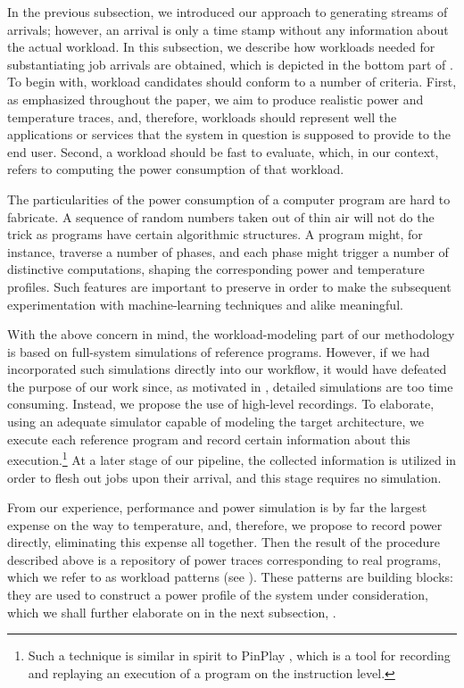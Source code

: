 In the previous subsection, we introduced our approach to generating streams of
arrivals; however, an arrival is only a time stamp without any information about
the actual workload. In this subsection, we describe how workloads needed for
substantiating job arrivals are obtained, which is depicted in the bottom part
of . To begin with, workload candidates should conform to a
number of criteria. First, as emphasized throughout the paper, we aim to produce
realistic power and temperature traces, and, therefore, workloads should
represent well the applications or services that the system in question is
supposed to provide to the end user. Second, a workload should be fast to
evaluate, which, in our context, refers to computing the power consumption of
that workload.

The particularities of the power consumption of a computer program are hard to
fabricate. A sequence of random numbers taken out of thin air will not do the
trick as programs have certain algorithmic structures. A program might, for
instance, traverse a number of phases, and each phase might trigger a number of
distinctive computations, shaping the corresponding power and temperature
profiles. Such features are important to preserve in order to make the
subsequent experimentation with machine-learning techniques and alike
meaningful.

With the above concern in mind, the workload-modeling part of our methodology is
based on full-system simulations of reference programs. However, if we had
incorporated such simulations directly into our workflow, it would have defeated
the purpose of our work since, as motivated in , detailed
simulations are too time consuming. Instead, we propose the use of high-level
recordings. To elaborate, using an adequate simulator capable of modeling the
target architecture, we execute each reference program and record certain
information about this execution.\footnote{Such a technique is similar in spirit
to PinPlay \cite{patil2010}, which is a tool for recording and replaying an
execution of a program on the instruction level.} At a later stage of our
pipeline, the collected information is utilized in order to flesh out jobs upon
their arrival, and this stage requires no simulation.

From our experience, performance and power simulation is by far the largest
expense on the way to temperature, and, therefore, we propose to record power
directly, eliminating this expense all together. Then the result of the
procedure described above is a repository of power traces corresponding to real
programs, which we refer to as workload patterns (see ). These
patterns are building blocks: they are used to construct a power profile of the
system under consideration, which we shall further elaborate on in the next
subsection, .

